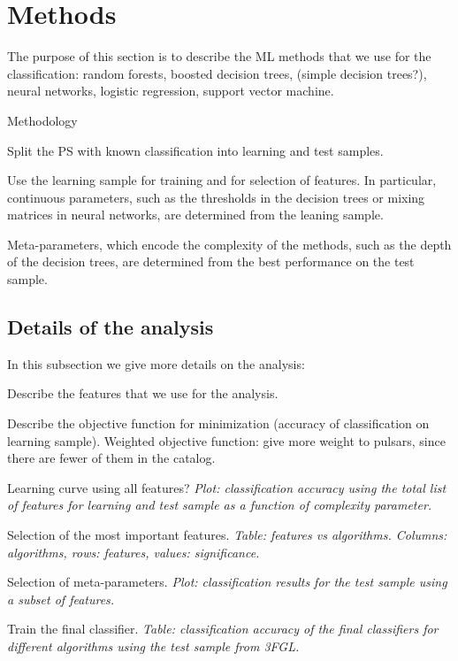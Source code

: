 \section{Methods}


The purpose of this section is to describe the ML methods that we use for the classification:
random forests, boosted decision trees, (simple decision trees?), neural networks, logistic regression, support vector machine.

Methodology
\ben
\item
Split the PS with known classification into learning and test samples.
\item
Use the learning sample for training and for selection of features.
In particular, continuous parameters, such as the thresholds in the decision trees or mixing matrices in neural networks, are determined from the leaning sample. 
\item
Meta-parameters, which encode the complexity of the methods, such as the depth of the decision trees,
are determined from the best performance on the test sample.
\een

\subsection{Details of the analysis}


In this subsection we give more details on the analysis:
\ben
\item
Describe the features that we use for the analysis.
\item
Describe the objective function for minimization (accuracy of classification on learning sample).
Weighted objective function: give more weight to pulsars, since there are fewer of them in the catalog.
\item
Learning curve using all features?
{\it Plot: classification accuracy using the total list of features for learning and test sample as a function of complexity parameter.}
\item
Selection of the most important features.
{\it Table: features vs algorithms. Columns: algorithms, rows: features, values: significance.}
\item
Selection of meta-parameters.
{\it Plot: classification results for the test sample using a subset of features.}
\item
Train the final classifier.
{\it Table: classification accuracy of the final classifiers for different algorithms using the test sample from 3FGL.}
\een

